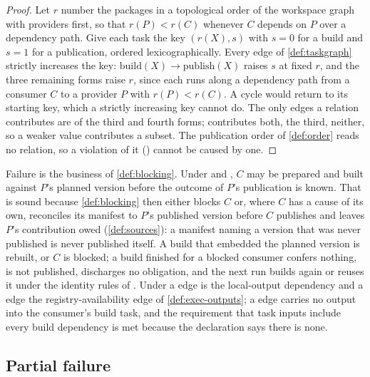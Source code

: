 \begin{proof}
Let $r$ number the packages in a topological order of the workspace graph with
providers first, so that $r(P) < r(C)$ whenever $C$ depends on $P$ over a
dependency path. Give each task the key $(r(X), s)$ with $s = 0$ for a build
and $s = 1$ for a publication, ordered lexicographically. Every edge of
\cref{def:taskgraph} strictly increases the key: $\mathrm{build}(X) \to
\mathrm{publish}(X)$ raises $s$ at fixed $r$, and the three remaining forms
raise $r$, since each runs along a dependency path from a consumer $C$ to a
provider $P$ with $r(P) < r(C)$. A cycle would return to its starting key,
which a strictly increasing key cannot do. The only edges a relation
contributes are of the third and fourth forms;  contributes both,
 the third,  neither, so a weaker value contributes a
subset. The publication order of \cref{def:order} reads no relation, so a
violation of it () cannot be caused by one.
\end{proof}

Failure is the business of \cref{def:blocking}. Under  and
, $C$ may be prepared and built against $P$'s planned version before
the outcome of $P$'s publication is known. That is sound because
\cref{def:blocking} then either blocks $C$ or, where $C$ has a cause of its
own, reconciles its manifest to $P$'s published version before $C$ publishes
and leaves $P$'s contribution owed (\cref{def:sources}): a manifest naming a
version that was never published is never published itself. A build that
embedded the planned version is rebuilt, or $C$ is blocked; a build finished
for a blocked consumer confers nothing, is not published, discharges no
obligation, and the next run builds again or reuses it under the identity rules
of . Under  a  edge is the local-output
dependency and a  edge the registry-availability edge of
\cref{def:exec-outputs}; a  edge carries no output into the
consumer's build task, and the requirement that task inputs include every
build dependency is met because the declaration says there is none.

\subsection{Partial failure}

